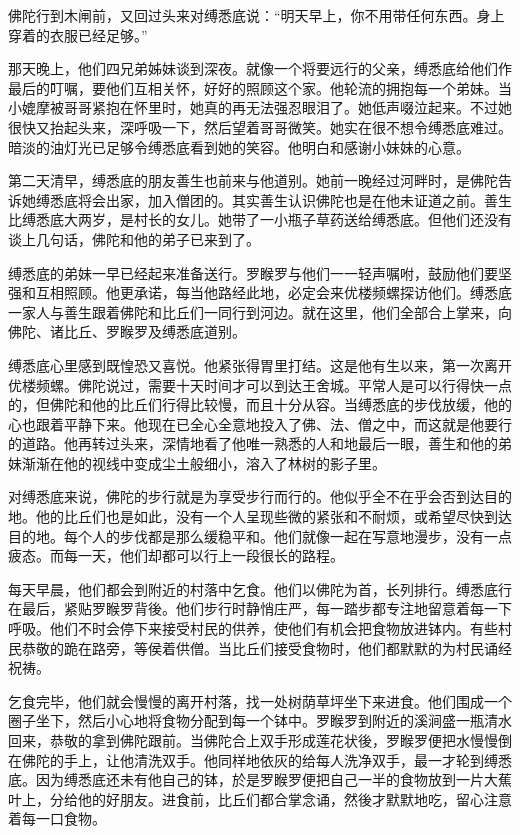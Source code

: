 \documentclass[12pt,twoside,openany]{book}
\begin{document}
佛陀行到木闸前，又回过头来对缚悉底说：“明天早上，你不用带任何东西。身上穿着的衣服已经足够。”

那天晚上，他们四兄弟姊妹谈到深夜。就像一个将要远行的父亲，缚悉底给他们作最后的叮嘱，要他们互相关怀，好好的照顾这个家。他轮流的拥抱每一个弟妹。当小媲摩被哥哥紧抱在怀里时，她真的再无法强忍眼泪了。她低声啜泣起来。不过她很快又抬起头来，深呼吸一下，然后望着哥哥微笑。她实在很不想令缚悉底难过。暗淡的油灯光已足够令缚悉底看到她的笑容。他明白和感谢小妹妹的心意。

第二天清早，缚悉底的朋友善生也前来与他道别。她前一晚经过河畔时，是佛陀告诉她缚悉底将会出家，加入僧团的。其实善生认识佛陀也是在他未证道之前。善生比缚悉底大两岁，是村长的女儿。她带了一小瓶子草药送给缚悉底。但他们还没有谈上几句话，佛陀和他的弟子已来到了。

缚悉底的弟妹一早已经起来准备送行。罗睺罗与他们一一轻声嘱咐，鼓励他们要坚强和互相照顾。他更承诺，每当他路经此地，必定会来优楼频螺探访他们。缚悉底一家人与善生跟着佛陀和比丘们一同行到河边。就在这里，他们全部合上掌来，向佛陀、诸比丘、罗睺罗及缚悉底道别。

缚悉底心里感到既惶恐又喜悦。他紧张得胃里打结。这是他有生以来，第一次离开优楼频螺。佛陀说过，需要十天时间才可以到达王舍城。平常人是可以行得快一点的，但佛陀和他的比丘们行得比较慢，而且十分从容。当缚悉底的步伐放缓，他的心也跟着平静下来。他现在已全心全意地投入了佛、法、僧之中，而这就是他要行的道路。他再转过头来，深情地看了他唯一熟悉的人和地最后一眼，善生和他的弟妹渐渐在他的视线中变成尘土般细小，溶入了林树的影子里。

对缚悉底来说，佛陀的步行就是为享受步行而行的。他似乎全不在乎会否到达目的地。他的比丘们也是如此，没有一个人呈现些微的紧张和不耐烦，或希望尽快到达目的地。每个人的步伐都是那么缓稳平和。他们就像一起在写意地漫步，没有一点疲态。而每一天，他们却都可以行上一段很长的路程。

每天早晨，他们都会到附近的村落中乞食。他们以佛陀为首，长列排行。缚悉底行在最后，紧贴罗睺罗背後。他们步行时静悄庄严，每一踏步都专注地留意着每一下呼吸。他们不时会停下来接受村民的供养，使他们有机会把食物放进钵内。有些村民恭敬的跪在路旁，等侯着供僧。当比丘们接受食物时，他们都默默的为村民诵经祝祷。

乞食完毕，他们就会慢慢的离开村落，找一处树荫草坪坐下来进食。他们围成一个圈子坐下，然后小心地将食物分配到每一个钵中。罗睺罗到附近的溪涧盛一瓶清水回来，恭敬的拿到佛陀跟前。当佛陀合上双手形成莲花状後，罗睺罗便把水慢慢倒在佛陀的手上，让他清洗双手。他同样地依灰的给每人洗净双手，最一才轮到缚悉底。因为缚悉底还未有他自己的钵，於是罗睺罗便把自己一半的食物放到一片大蕉叶上，分给他的好朋友。进食前，比丘们都合掌念诵，然後才默默地吃，留心注意着每一口食物。
\end{document}
